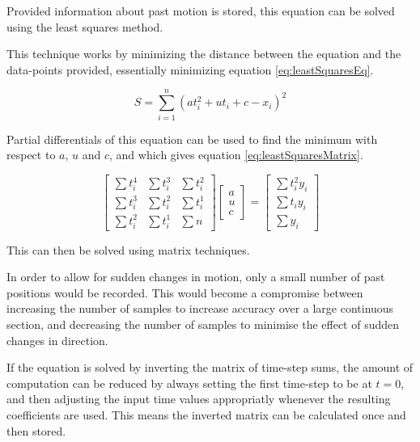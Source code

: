 \documentclass[10pt]{article}
\begin{document}
Provided information about past motion is stored, this equation can be solved
using the least squares method.  

This technique works by minimizing the distance between the equation and the
data-points provided, essentially minimizing equation \ref{eq:leastSquaresEq}.

\begin{equation}
  S = \sum_{i=1}^n (a t_i^2+ u t_i + c - x_i)^2 
  \label{eq:leastSquaresEq}
\end{equation}

Partial differentials of this equation can be used to find the minimum with
respect to $a$, $u$ and $c$, and which gives equation
\ref{eq:leastSquaresMatrix}.

\begin{equation}
  \left[
   \begin{matrix}
    \sum t_i^4 & \sum t_i^3 & \sum t_i^2 \\
    \sum t_i^3 & \sum t_i^2 & \sum t_i^1 \\
    \sum t_i^2 & \sum t_i^1 & \sum n
   \end{matrix}
  \right]
  \left[
   \begin{matrix}
    a \\
    u \\
    c
   \end{matrix}
  \right]
  =
  \left[
   \begin{matrix}
    \sum t_i^2 y_i \\
    \sum t_i y_i \\
    \sum y_i
   \end{matrix}
  \right]
  \label{eq:leastSquaresMatrix}
\end{equation}

This can then be solved using matrix techniques.

In order to allow for sudden changes in motion, only a small number of past
positions would be recorded.  This would become a compromise between increasing
the number of samples to increase accuracy over a large continuous section, and
decreasing the number of samples to minimise the effect of sudden changes in
direction.

If the equation is solved by inverting the matrix of time-step sums, the amount
of computation can be reduced by always setting the first time-step to be at
$t=0$, and then adjusting the input time values appropriatly whenever the
resulting coefficients are used.  This means the inverted matrix can be
calculated once and then stored.
\end{document}
